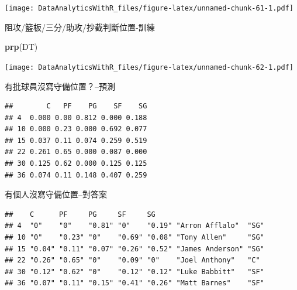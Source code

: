 \documentclass[
]{book}
\newenvironment{Shaded}{\begin{snugshade}}{\end{snugshade}}
\newcommand{\CommentTok}[1]{\textcolor[rgb]{0.56,0.35,0.01}{\textit{#1}}}
\newcommand{\DataTypeTok}[1]{\textcolor[rgb]{0.13,0.29,0.53}{#1}}
\newcommand{\DecValTok}[1]{\textcolor[rgb]{0.00,0.00,0.81}{#1}}
\newcommand{\KeywordTok}[1]{\textcolor[rgb]{0.13,0.29,0.53}{\textbf{#1}}}
\newcommand{\NormalTok}[1]{#1}
\newcommand{\OperatorTok}[1]{\textcolor[rgb]{0.81,0.36,0.00}{\textbf{#1}}}
\begin{document}
\texttt{[image: DataAnalyticsWithR\_files/figure-latex/unnamed-chunk-61-1.pdf]}

阻攻/籃板/三分/助攻/抄截判斷位置-訓練

\begin{Shaded}
\begin{Highlighting}[]
\KeywordTok{prp}\NormalTok{(DT)}
\end{Highlighting}
\end{Shaded}

\texttt{[image: DataAnalyticsWithR\_files/figure-latex/unnamed-chunk-62-1.pdf]}

有批球員沒寫守備位置？--預測

\begin{Shaded}
\end{Shaded}

\begin{verbatim}
##        C   PF    PG    SF    SG
## 4  0.000 0.00 0.812 0.000 0.188
## 10 0.000 0.23 0.000 0.692 0.077
## 15 0.037 0.11 0.074 0.259 0.519
## 22 0.261 0.65 0.000 0.087 0.000
## 30 0.125 0.62 0.000 0.125 0.125
## 36 0.074 0.11 0.148 0.407 0.259
\end{verbatim}

有個人沒寫守備位置--對答案

\begin{Shaded}
\end{Shaded}

\begin{verbatim}
##    C      PF     PG     SF     SG                          
## 4  "0"    "0"    "0.81" "0"    "0.19" "Arron Afflalo"  "SG"
## 10 "0"    "0.23" "0"    "0.69" "0.08" "Tony Allen"     "SG"
## 15 "0.04" "0.11" "0.07" "0.26" "0.52" "James Anderson" "SG"
## 22 "0.26" "0.65" "0"    "0.09" "0"    "Joel Anthony"   "C" 
## 30 "0.12" "0.62" "0"    "0.12" "0.12" "Luke Babbitt"   "SF"
## 36 "0.07" "0.11" "0.15" "0.41" "0.26" "Matt Barnes"    "SF"
\end{verbatim}
\end{document}
